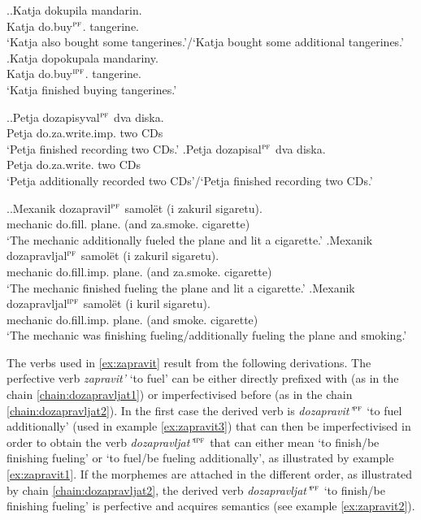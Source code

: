 \ex.\ag.\label{ex:do:kupit}Katja dokupila mandarin.\\
Katja do.buy$^{\textsc{pf}}$. tangerine.\\
\trans `Katja also bought some tangerines.'/`Katja bought some additional tangerines.'
\bg.\label{ex:do:pokupat}Katja dopokupala mandariny.\\
Katja do.buy$^{\textsc{ipf}}$. tangerine.\\
\trans `Katja finished buying tangerines.'

\ex.\ag.\label{ex:do:zapisyvat}Petja dozapisyval$^{\textsc{pf}}$ dva diska.\\
Petja do.za.write.imp. two CDs\\
\trans `Petja finished recording two CDs.'
\bg.\label{ex:do:zapisat}Petja dozapisal$^{\textsc{pf}}$ dva diska.\\
Petja do.za.write. two CDs\\
\trans `Petja additionally recorded two CDs'/`Petja finished recording two CDs.'

\ex.\label{ex:zapravit}\ag.\label{ex:zapravit3}Mexanik dozapravil$^{\textsc{pf}}$ samol\"et (i zakuril sigaretu).\\
mechanic do.fill. plane. (and za.smoke. cigarette)\\
\trans `The mechanic additionally fueled the plane and lit a cigarette.'
\bg.\label{ex:zapravit2}Mexanik dozapravljal$^{\textsc{pf}}$ samol\"et (i zakuril sigaretu).\\
mechanic do.fill.imp. plane. (and za.smoke. cigarette)\\
\trans `The mechanic finished fueling the plane and lit a cigarette.'
\bg.\label{ex:zapravit1}Mexanik dozapravljal$^{\textsc{ipf}}$ samol\"et (i kuril sigaretu).\\
mechanic do.fill.imp. plane. (and smoke. cigarette)\\
\trans `The mechanic was finishing fueling/additionally fueling the plane and smoking.'

The verbs used in \ref{ex:zapravit} result from the following derivations. The perfective verb \textit{zapravit'} `to fuel' can be either directly prefixed with  (as in the chain \ref{chain:dozapravljat1}) or imperfectivised before (as in the chain \ref{chain:dozapravljat2}). In the first case the derived verb is \textit{dozapravit'}$^{\textsc{pf}}$ `to fuel additionally' (used in example \ref{ex:zapravit3}) that can then be imperfectivised in order to obtain the verb \textit{dozapravljat'}$^{\textsc{ipf}}$ that can either mean `to finish/be finishing fueling' or `to fuel/be fueling additionally', as illustrated by example \ref{ex:zapravit1}. If the morphemes are attached in the different order, as illustrated by chain \ref{chain:dozapravljat2}, the derived verb \textit{dozapravljat'}$^{\textsc{pf}}$ `to finish/be finishing fueling' is perfective and acquires  semantics (see example \ref{ex:zapravit2}).


